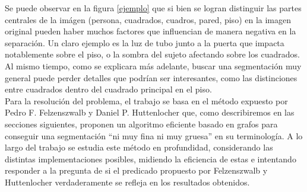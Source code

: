 Se puede observar en la figura \ref{ejemplo} que si bien se logran distinguir las partes centrales de la im\'agen (persona, cuadrados, cuadros, pared, piso) en la imagen original pueden haber muchos factores que influencian de manera negativa en la separaci\'on. Un claro ejemplo es la luz de tubo junto a la puerta que impacta notablemente sobre el piso, o la sombra del sujeto afectando sobre los cuadrados. Al mismo tiempo, como se explicara m\'as adelante, buscar una segmentaci\'on muy general puede perder detalles que podr\'ian ser interesantes, como las distinciones entre cuadrados dentro del cuadrado principal en el piso.\\ 
Para la resoluci\'on del problema, el trabajo se basa en el m\'etodo expuesto por Pedro F. Felzenszwalb y Daniel P. Huttenlocher \cite{Felzenszwalb2004} que, como describiremos en las secciones siguientes, proponen un algoritmo eficiente basado en grafos para conseguir una segmentaci\'on ``ni muy fina ni muy gruesa'' en su terminolog\'ia. A lo largo del trabajo se estudia este m\'etodo en profundidad, considerando las distintas implementaciones posibles, midiendo la eficiencia de estas e intentando responder a la pregunta de si el predicado propuesto por Felzenszwalb y Huttenlocher verdaderamente se refleja en los resultados obtenidos.

